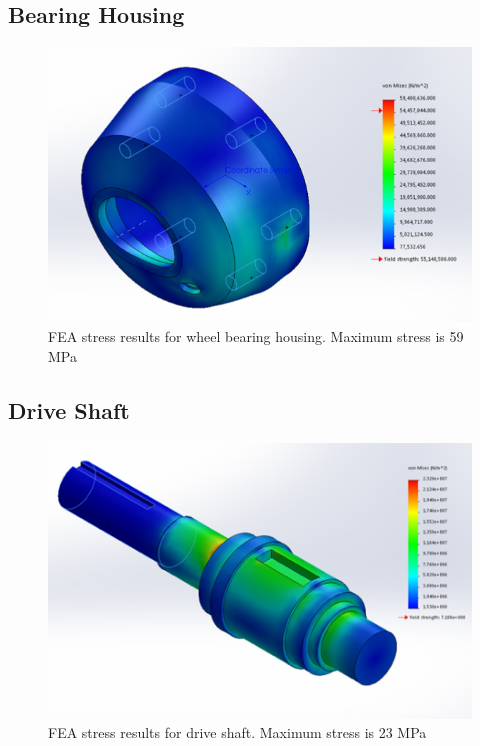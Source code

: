 \subsection{Bearing Housing}\label{sec:bh_fea}

\begin{figure}[H]
\centering
\includegraphics[width=\textwidth]{images/wheel_hub_fea}
\caption[Wheel Bearing Housing FEA Stress Results]{FEA stress results for wheel bearing housing. Maximum stress is 59 MPa}
\label{fig:wheel_hub_stress_fea}
\end{figure}


\subsection{Drive Shaft}\label{sec:drive_shaft_fea}

\begin{figure}[H]
\centering
\includegraphics[width=\textwidth]{images/FEA_driveShaft}
\caption[Drive Shaft FEA Stress Results]{FEA stress results for drive shaft. Maximum stress is 23 MPa}
\label{fig:wheel_shaft_stress_fea}
\end{figure}

